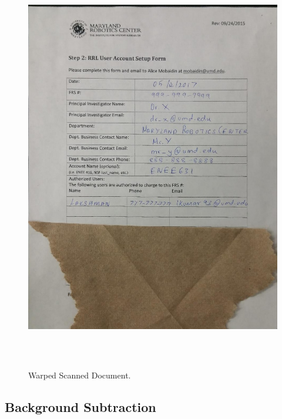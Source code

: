 \begin{figure}[th]
	\centering
	\includegraphics[height=18cm ]{Figures/warped_scanned_image}
	\caption[Warped Scanned Document]{Warped Scanned Document.}
	\label{fig:WarpedFilledDocument}
\end{figure}
\pagebreak


\subsection{Background Subtraction}

